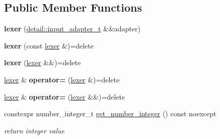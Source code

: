 \subsection*{Public Member Functions}
\begin{DoxyCompactItemize}
\item 
\mbox{\label{classnlohmann_1_1detail_1_1lexer_ab6818e0fc05f4a52c65aeb967dd79919}} 
{\bfseries lexer} (\hyperlink{namespacenlohmann_1_1detail_ae132f8cd5bb24c5e9b40ad0eafedf1c2}{detail\+::input\+\_\+adapter\+\_\+t} \&\&adapter)
\item 
\mbox{\label{classnlohmann_1_1detail_1_1lexer_a2e8ce2a0d266d148b69dfbcc2e4ad71a}} 
{\bfseries lexer} (const \hyperlink{classnlohmann_1_1detail_1_1lexer}{lexer} \&)=delete
\item 
\mbox{\label{classnlohmann_1_1detail_1_1lexer_a9045348915010649fad1f15e80b6e34d}} 
{\bfseries lexer} (\hyperlink{classnlohmann_1_1detail_1_1lexer}{lexer} \&\&)=delete
\item 
\mbox{\label{classnlohmann_1_1detail_1_1lexer_a33e97dee7c5faf1b36aff5b74a6c8f55}} 
\hyperlink{classnlohmann_1_1detail_1_1lexer}{lexer} \& {\bfseries operator=} (\hyperlink{classnlohmann_1_1detail_1_1lexer}{lexer} \&)=delete
\item 
\mbox{\label{classnlohmann_1_1detail_1_1lexer_af8ab91a774484fa220ba073421c8f452}} 
\hyperlink{classnlohmann_1_1detail_1_1lexer}{lexer} \& {\bfseries operator=} (\hyperlink{classnlohmann_1_1detail_1_1lexer}{lexer} \&\&)=delete
\item 
\mbox{\label{classnlohmann_1_1detail_1_1lexer_afa338d17c0a7e834c73104258a2c8ced}} 
constexpr number\+\_\+integer\+\_\+t \hyperlink{classnlohmann_1_1detail_1_1lexer_afa338d17c0a7e834c73104258a2c8ced}{get\+\_\+number\+\_\+integer} () const noexcept
\begin{DoxyCompactList}\small\item\em return integer value \end{DoxyCompactList}\item 
\mbox{\label{classnlohmann_1_1detail_1_1lexer_a56640fb92293e0c17742ca3c814d74d6}} 

\end{DoxyCompactItemize}
